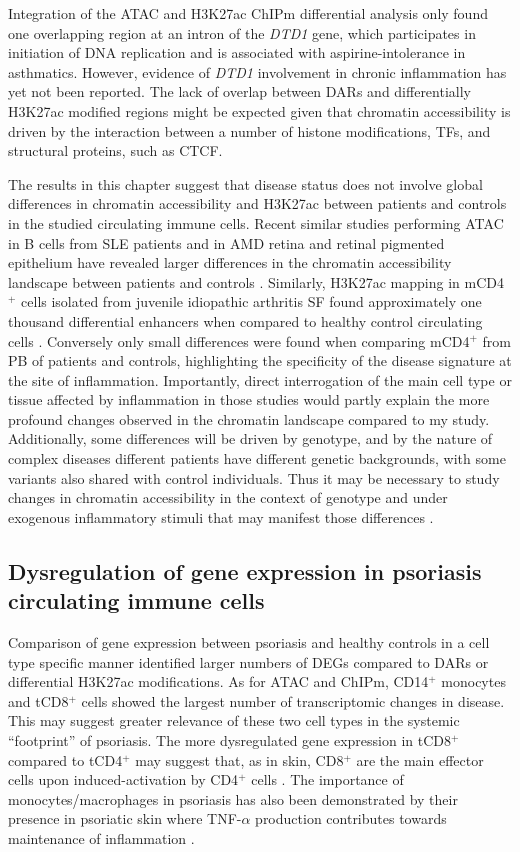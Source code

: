 Integration of the ATAC and H3K27ac ChIPm differential analysis only found one overlapping region at an intron of the \textit{DTD1} gene, which participates in initiation of DNA replication and is associated with aspirine-intolerance in asthmatics\parencite{Pasaje2011}. However, evidence of \textit{DTD1} involvement in chronic inflammation has yet not been reported. The lack of overlap between DARs and differentially H3K27ac modified regions might be expected given that chromatin accessibility is driven by the interaction between a number of histone modifications, TFs, and structural proteins, such as CTCF. 

The results in this chapter suggest that disease status does not involve global differences in chromatin accessibility and H3K27ac between patients and controls in the studied circulating immune cells. Recent similar studies performing ATAC in B cells from SLE patients and in AMD retina and retinal pigmented epithelium have revealed larger differences in the chromatin accessibility landscape between patients and controls \parencite{Scharer2016,Wang2018}. Similarly, H3K27ac mapping in mCD4$^+$ cells isolated from juvenile idiopathic arthritis SF found approximately one thousand differential enhancers when compared to healthy control circulating cells \parencite{Peeters2015}. Conversely only small differences were found when comparing mCD4$^+$ from PB of patients and controls, highlighting the specificity of the disease signature at the site of inflammation. Importantly, direct interrogation of the main cell type or tissue affected by inflammation in those studies would partly explain the more profound changes observed in the chromatin landscape compared to my study. Additionally, some differences will be driven by genotype, and by the nature of complex diseases different patients have different genetic backgrounds, with some variants also shared with control individuals. Thus it may be necessary to study changes in chromatin accessibility in the context of genotype and under exogenous inflammatory stimuli that may manifest those differences \parencite{Alasoo2018,Calderon2018}.

\subsection{Dysregulation of gene expression in psoriasis circulating immune cells}
Comparison of gene expression between psoriasis and healthy controls in a cell type specific manner identified larger numbers of DEGs compared to DARs or differential H3K27ac modifications. As for ATAC and ChIPm, CD14$^+$ monocytes and tCD8$^+$ cells showed the largest number of transcriptomic changes in disease. This may suggest greater relevance of these two cell types in the systemic “footprint” of psoriasis.   The more dysregulated gene expression in tCD8$^+$ compared to tCD4$^+$ may suggest that, as in skin, CD8$^+$ are the main effector cells upon induced-activation by CD4$^+$ cells \parencite{Nickoloff1999}. The importance of monocytes/macrophages in psoriasis has also been demonstrated by their presence in psoriatic skin where TNF-$\alpha$ production contributes towards maintenance of inflammation \parencite{Nickoloff2000,Wang2006}. 

